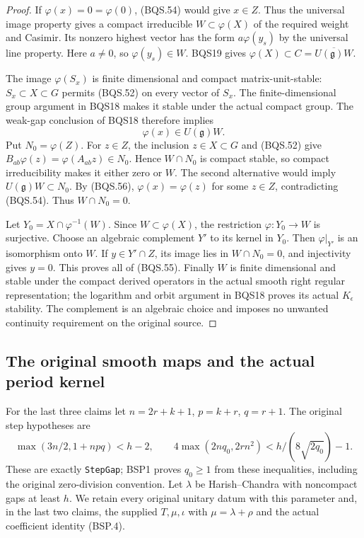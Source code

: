 \begin{proof}
If $\varphi(x)=0=\varphi(0)$, (BQS.54) would give $x\in Z$.
Thus the universal image property gives a compact irreducible
$W\subset\varphi(X)$ of the required weight and Casimir.
Its nonzero highest vector has the form $a\varphi(y_s)$ by the
universal line property.  Here $a\ne0$, so $\varphi(y_s)\in W$.
BQS19 gives $\varphi(X)\subset C=\overline{U(\mathfrak g)W}$.

The image $\varphi(S_x)$ is finite dimensional and compact
matrix-unit-stable: $S_x\subset X\subset G$ permits (BQS.52)
on every vector of $S_x$.  The finite-dimensional group
argument in BQS18 makes it stable under the actual compact
group.  The weak-gap conclusion of BQS18 therefore implies
\[
                       \varphi(x)\in U(\mathfrak g)W.
 \tag{BQS.56}
\]
Put $N_0=\varphi(Z)$.  For $z\in Z$, the inclusion
$z\in X\subset G$ and (BQS.52) give
$B_{ab}\varphi(z)=\varphi(A_{ab}z)\in N_0$.
Hence $W\cap N_0$ is compact stable, so compact irreducibility
makes it either zero or $W$.
The second alternative would imply
$U(\mathfrak g)W\subset N_0$.
By (BQS.56), $\varphi(x)=\varphi(z)$ for some $z\in Z$,
contradicting (BQS.54).  Thus $W\cap N_0=0$.

Let $Y_0=X\cap\varphi^{-1}(W)$.
Since $W\subset\varphi(X)$, the restriction
$\varphi:Y_0\to W$ is surjective.
Choose an algebraic complement $Y'$ to its kernel in $Y_0$.
Then $\varphi|_{Y'}$ is an isomorphism onto $W$.
If $y\in Y'\cap Z$, its image lies in $W\cap N_0=0$,
and injectivity gives $y=0$.
This proves all of (BQS.55).  Finally $W$ is finite dimensional
and stable under the compact derived operators in the actual
smooth right regular representation; the logarithm and orbit
argument in BQS18 proves its actual $K_\epsilon$ stability.
The complement is an algebraic choice and imposes no unwanted
continuity requirement on the original source.
\end{proof}

\subsection{The original smooth maps and the actual period kernel}

For the last three claims let $n=2r+k+1$, $p=k+r$, $q=r+1$.
The original step hypotheses are
\[
 \max(3n/2,1+npq)<h-2,\qquad
 4\max(2nq_0,2rn^2)<h/(8\sqrt{2q_0})-1.
 \tag{BQS.57}
\]
These are exactly \texttt{StepGap}; BSP1 proves $q_0\ge1$
from these inequalities, including the original zero-division convention.
Let $\lambda$ be Harish--Chandra with noncompact gaps at least $h$.
We retain every original unitary datum with this parameter and, in the
last two claims, the supplied $T,\mu,\iota$ with
$\mu=\lambda+\rho$ and the actual coefficient identity (BSP.4).


